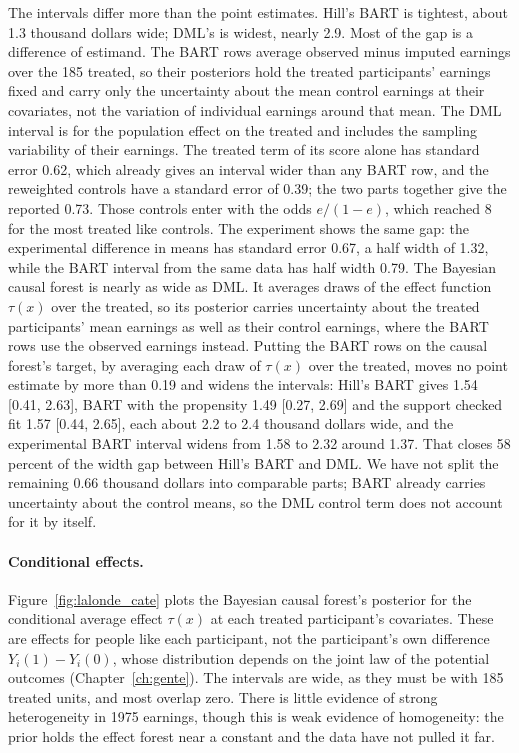 The intervals differ more than the point estimates. Hill's BART is tightest, about 1.3 thousand dollars wide; DML's is widest, nearly 2.9. Most of the gap is a difference of estimand. The BART rows average observed minus imputed earnings over the 185 treated, so their posteriors hold the treated participants' earnings fixed and carry only the uncertainty about the mean control earnings at their covariates, not the variation of individual earnings around that mean. The DML interval is for the population effect on the treated and includes the sampling variability of their earnings. The treated term of its score alone has standard error 0.62, which already gives an interval wider than any BART row, and the reweighted controls have a standard error of 0.39; the two parts together give the reported 0.73. Those controls enter with the odds $e/(1 - e)$, which reached 8 for the most treated like controls. The experiment shows the same gap: the experimental difference in means has standard error 0.67, a half width of 1.32, while the BART interval from the same data has half width 0.79. The Bayesian causal forest is nearly as wide as DML. It averages draws of the effect function $\tau(x)$ over the treated, so its posterior carries uncertainty about the treated participants' mean earnings as well as their control earnings, where the BART rows use the observed earnings instead. Putting the BART rows on the causal forest's target, by averaging each draw of $\tau(x)$ over the treated, moves no point estimate by more than 0.19 and widens the intervals: Hill's BART gives 1.54 [0.41, 2.63], BART with the propensity 1.49 [0.27, 2.69] and the support checked fit 1.57 [0.44, 2.65], each about 2.2 to 2.4 thousand dollars wide, and the experimental BART interval widens from 1.58 to 2.32 around 1.37. That closes 58 percent of the width gap between Hill's BART and DML. We have not split the remaining 0.66 thousand dollars into comparable parts; BART already carries uncertainty about the control means, so the DML control term does not account for it by itself.

\paragraph{Conditional effects.} Figure~\ref{fig:lalonde_cate} plots the Bayesian causal forest's posterior for the conditional average effect $\tau(x)$ at each treated participant's covariates. These are effects for people like each participant, not the participant's own difference $Y_i(1) - Y_i(0)$, whose distribution depends on the joint law of the potential outcomes (Chapter~\ref{ch:gente}). The intervals are wide, as they must be with 185 treated units, and most overlap zero. There is little evidence of strong heterogeneity in 1975 earnings, though this is weak evidence of homogeneity: the prior holds the effect forest near a constant and the data have not pulled it far.


